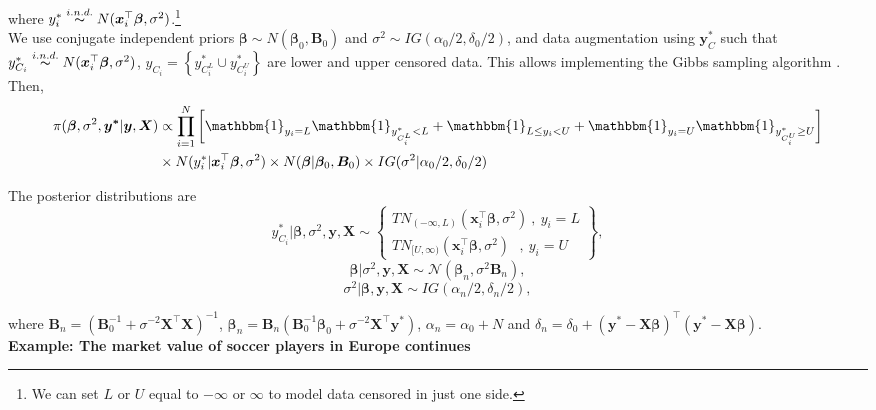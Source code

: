 where $y_i^*\stackrel{i.n.d.} {\thicksim}{N}(\bm{x}_i^{\top}\bm{\beta},\sigma^2)$.\footnote{We can set $L$ or $U$ equal to $-\infty$ or $\infty$ to model data censored in just one side.}\\

We use conjugate independent priors $\bm{\beta}\sim N(\bm{\beta}_0,\bm{B}_0)$ and 
$\sigma^2 \sim IG(\alpha_0/2, \delta_0/2)$, and data augmentation using $\bm{y}^*_C$ such that $y_{C_i}^*\stackrel{i.n.d.} {\thicksim}N(\bm{x}_i^{\top}\bm{\beta},\sigma^2)$, $y_{C_i}=\left\{y_{C_i^L}^*\cup y_{C_i^U}^*\right\}$ are lower and upper censored data. This allows implementing the Gibbs sampling algorithm \cite{Chib1992}.
Then, \begin{align*}
\pi(\bm{\beta},\sigma^2,\bm{y^*}|\bm{y},\bm{X})&\propto\prod_{i=1}^N\left[\mathbbm{1}_{y_i=L}\mathbbm{1}_{y_{C_i^L}^* < L}+\mathbbm{1}_{L\leq y_i < U}+\mathbbm{1}_{y_i=U}\mathbbm{1}_{y_{C_i^U}^* \geq U}\right]\\
&\times{N}(y_i^*|\bm{x}_i^{\top}\bm{\beta},\sigma^2)\times N(\bm{\beta}|\bm{\beta}_0,\bm{B}_0)\times IG(\sigma^2|\alpha_0/2, \delta_0/2)
\end{align*}

The posterior distributions are
\begin{equation*}
	y_{C_i}^*|\bm{\beta},\sigma^2,\bm{y},\bm{X}\sim\begin{Bmatrix}
		TN_{(-\infty,L)}(\bm{x}_i^{\top}\bm{\beta},\sigma^2) \ , \ y_i= L \\ 
		TN_{[U,\infty)}(\bm{x}_i^{\top}\bm{\beta},\sigma^2) \ \ \ , \ y_i= U
	\end{Bmatrix},
\end{equation*}
\begin{equation*}
	\bm{\beta}|\sigma^2, \bm{y}, \bm{X} \sim \mathcal{N}(\bm{\beta}_n, \sigma^2\bm{B}_n), 
\end{equation*}
\begin{equation*}
	\sigma^2|\bm{\beta}, \bm{y}, \bm{X} \sim IG(\alpha_n/2, \delta_n/2),
\end{equation*}

where $\bm{B}_n = (\bm{B}_0^{-1} + \sigma^{-2}\bm{X}^{\top}\bm{X})^{-1}$, $\bm{\beta}_n= \bm{B}_n(\bm{B}_0^{-1}\bm{\beta}_0 + \sigma^{-2}\bm{X}^{\top}\bm{y}^*)$, $\alpha_n = \alpha_0 + N$ and $\delta_n = \delta_0 + (\bm{y}^*-\bm{X}\bm{\beta})^{\top}(\bm{y}^*-\bm{X}\bm{\beta})$.\\

\textbf{Example: The market value of soccer players in Europe continues}


